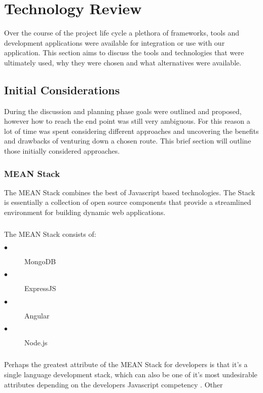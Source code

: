 \chapter{Technology Review}
Over the course of the project life cycle a plethora of frameworks, tools and development applications were available for integration or use with our application. This section aims to discuss the tools and technologies that were ultimately used, why they were chosen and what alternatives were available. 

\section{Initial Considerations}
During the discussion and planning phase goals were outlined and proposed, however how to reach the end point was still very ambiguous. For this reason a lot of time was spent considering different approaches and uncovering the benefits and drawbacks of venturing down a chosen route. This brief section will outline those initially considered approaches.
\subsection{MEAN Stack}
The MEAN Stack combines the best of Javascript based technologies. The Stack is essentially a collection of open source components that provide a streamlined environment for building dynamic web applications. 

\paragraph{}
The MEAN Stack consists of:

\begin{description}
  \item[$\bullet$] MongoDB
  \item[$\bullet$] ExpressJS
  \item[$\bullet$] Angular
  \item[$\bullet$] Node.js
\end{description}

\paragraph{}
Perhaps the greatest attribute of the MEAN Stack for developers is that it's a single language development stack, which can also be one of it's most undesirable attributes depending on the developers Javascript competency . Other 
